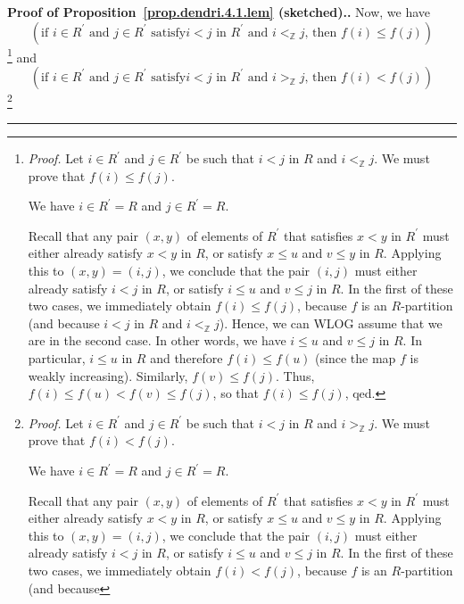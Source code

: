 \documentclass[numbers=enddot,12pt,final,onecolumn,notitlepage]{scrartcl}%
\theoremstyle{definition}
\newenvironment{proof}[1][Proof]{\noindent\textbf{#1.} }{\ \rule{0.5em}{0.5em}}
\newenvironment{verlong}{}{}
\begin{document}
\begin{verlong}
\begin{proof}[Proof of Proposition~\ref{prop.dendri.4.1.lem} (sketched).]
Now, we have%
\[
\left(  \text{if }i\in R^{\prime}\text{ and }j\in R^{\prime}\text{ satisfy
}i<j\text{ in }R^{\prime}\text{ and }i<_{\mathbb{Z}}j\text{, then }f\left(
i\right)  \leq f\left(  j\right)  \right)
\]
\footnote{\textit{Proof.} Let $i\in R^{\prime}$ and $j\in R^{\prime}$ be such
that $i<j$ in $R$ and $i<_{\mathbb{Z}}j$. We must prove that $f\left(
i\right)  \leq f\left(  j\right)  $.
\par
We have $i\in R^{\prime}=R$ and $j\in R^{\prime}=R$.
\par
Recall that any pair $\left(  x,y\right)  $ of elements of $R^{\prime}$ that
satisfies $x<y$ in $R^{\prime}$ must either already satisfy $x<y$ in $R$, or
satisfy $x\leq u$ and $v\leq y$ in $R$. Applying this to $\left(  x,y\right)
=\left(  i,j\right)  $, we conclude that the pair $\left(  i,j\right)  $ must
either already satisfy $i<j$ in $R$, or satisfy $i\leq u$ and $v\leq j$ in
$R$. In the first of these two cases, we immediately obtain $f\left(
i\right)  \leq f\left(  j\right)  $, because $f$ is an $R$-partition (and
because $i<j$ in $R$ and $i<_{\mathbb{Z}}j$). Hence, we can WLOG assume that
we are in the second case. In other words, we have $i\leq u$ and $v\leq j$ in
$R$. In particular, $i\leq u$ in $R$ and therefore $f\left(  i\right)  \leq
f\left(  u\right)  $ (since the map $f$ is weakly increasing). Similarly,
$f\left(  v\right)  \leq f\left(  j\right)  $. Thus, $f\left(  i\right)  \leq
f\left(  u\right)  <f\left(  v\right)  \leq f\left(  j\right)  $, so that
$f\left(  i\right)  \leq f\left(  j\right)  $, qed.} and%
\[
\left(  \text{if }i\in R^{\prime}\text{ and }j\in R^{\prime}\text{ satisfy
}i<j\text{ in }R^{\prime}\text{ and }i>_{\mathbb{Z}}j\text{, then }f\left(
i\right)  <f\left(  j\right)  \right)
\]
\footnote{\textit{Proof.} Let $i\in R^{\prime}$ and $j\in R^{\prime}$ be such
that $i<j$ in $R$ and $i>_{\mathbb{Z}}j$. We must prove that $f\left(
i\right)  <f\left(  j\right)  $.
\par
We have $i\in R^{\prime}=R$ and $j\in R^{\prime}=R$.
\par
Recall that any pair $\left(  x,y\right)  $ of elements of $R^{\prime}$ that
satisfies $x<y$ in $R^{\prime}$ must either already satisfy $x<y$ in $R$, or
satisfy $x\leq u$ and $v\leq y$ in $R$. Applying this to $\left(  x,y\right)
=\left(  i,j\right)  $, we conclude that the pair $\left(  i,j\right)  $ must
either already satisfy $i<j$ in $R$, or satisfy $i\leq u$ and $v\leq j$ in
$R$. In the first of these two cases, we immediately obtain $f\left(
i\right)  <f\left(  j\right)  $, because $f$ is an $R$-partition (and because
}
\end{proof}
\end{verlong}
\end{document}
